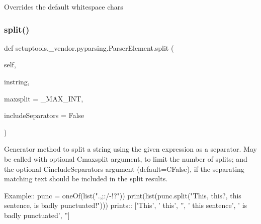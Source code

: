\begin{DoxyVerb}Overrides the default whitespace chars
\end{DoxyVerb}
 \mbox{\label{classsetuptools_1_1__vendor_1_1pyparsing_1_1ParserElement_a261b8172db2d9632b1945ecd174bd3eb}} 
\subsubsection{\texorpdfstring{split()}{split()}}
{\footnotesize\ttfamily def setuptools.\+\_\+vendor.\+pyparsing.\+Parser\+Element.\+split (\begin{DoxyParamCaption}\item[{}]{self,  }\item[{}]{instring,  }\item[{}]{maxsplit = {\ttfamily \+\_\+MAX\+\_\+INT},  }\item[{}]{include\+Separators = {\ttfamily False} }\end{DoxyParamCaption})}

\begin{DoxyVerb}Generator method to split a string using the given expression as a separator.
May be called with optional C{maxsplit} argument, to limit the number of splits;
and the optional C{includeSeparators} argument (default=C{False}), if the separating
matching text should be included in the split results.

Example::        
    punc = oneOf(list(".,;:/-!?"))
    print(list(punc.split("This, this?, this sentence, is badly punctuated!")))
prints::
    ['This', ' this', '', ' this sentence', ' is badly punctuated', '']
\end{DoxyVerb}
 \mbox{\label{classsetuptools_1_1__vendor_1_1pyparsing_1_1ParserElement_ac6937508ff09119b5bd3b6d7b6711845}} 
